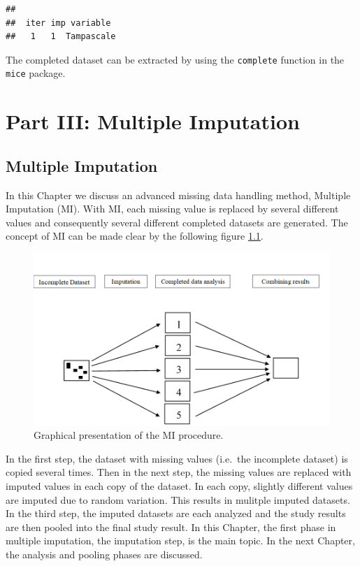 \documentclass[]{book}
\begin{document}
\begin{verbatim}
## 
##  iter imp variable
##   1   1  Tampascale
\end{verbatim}

The completed dataset can be extracted by using the \texttt{complete}
function in the \texttt{mice} package.

\part{Part III: Multiple
Imputation}\label{part-part-iii-multiple-imputation}

\chapter{Multiple Imputation}\label{multiple-imputation}

In this Chapter we discuss an advanced missing data handling method,
Multiple Imputation (MI). With MI, each missing value is replaced by
several different values and consequently several different completed
datasets are generated. The concept of MI can be made clear by the
following figure \ref{fig:fig4-1}.

\begin{figure}

{\centering \includegraphics[width=0.9\linewidth]{images/fig4.1} 

}

\caption{Graphical presentation of the MI procedure.}\label{fig:fig4-1}
\end{figure}

In the first step, the dataset with missing values (i.e.~the incomplete
dataset) is copied several times. Then in the next step, the missing
values are replaced with imputed values in each copy of the dataset. In
each copy, slightly different values are imputed due to random
variation. This results in mulitple imputed datasets. In the third step,
the imputed datasets are each analyzed and the study results are then
pooled into the final study result. In this Chapter, the first phase in
multiple imputation, the imputation step, is the main topic. In the next
Chapter, the analysis and pooling phases are discussed.
\end{document}
